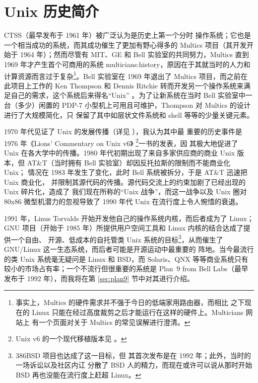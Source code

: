 \newpart
\section{Unix 历史简介}\label{sec:intro}

CTSS（最早发布于 1961 年）被广泛认为是历史上第一个分时
操作系统；它也是一个相当成功的系统，而其成功催生了更加有野心得多的 Multics%
 项目（其开发开始于 1964 年）；然而尽管有 MIT、GE 和
Bell 实验室的共同努力，Multics 直到 1969 年才产生首个可商用的系统\cupercite%
{multicians:history}，原因在于其就当时的人力和计算资源而言过于复杂\footnote{%
\label{fn:multics}事实上，Multics 的硬件需求并不强于今日的低端家用路由器，而相比
之下现在的 Linux 只能在经过高度裁剪之后才能运行在这样的硬件上。Multicians 网站上
有一个页面对关于 Multics 的常见误解进行澄清。}。Bell
实验室在 1969 年退出了 Multics 项目，而之前在此项目上工作的 Ken Thompson 和
Dennis Ritchie 转而开发另一个操作系统来满足自己的需求，这个系统后来得名“Unix”%
。为了让新系统在当时 Bell 实验室中一台（多少）闲置的
PDP-7 小型机上可用且可维护，Thompson 对 Multics 的设计进行了大规模简化，只
保留了其中如层状文件系统和 shell 等等的少量关键元素。

1970 年代见证了 Unix 的发展传播（详见 \parencite{wiki:unixhist}），我认为其中最
重要的历史事件是 1976 年《Lions' Commentary on Unix v6》%
\footnote{Unix v6 的一个现代移植版本见 \parencite{wiki:xv6}。}一书的发表，因
其极大地促进了 Unix 在各大学中的传播。1980 年代初期出现了来自多家供应商的商业
Unix 版本，但 AT\&T（当时拥有 Bell 实验室）却因反托拉斯的限制而不能商业化 Unix；
情况在 1983 年发生了变化，此时 Bell 系统被拆分，于是 AT\&T 迅速把 Unix 商业化，
并限制其源代码的传播。源代码交流上的约束加剧了已经出现的 Unix 碎片化，造成了
我们现在所称的“Unix 战争”，而这一战争以及 Unix 圈对
80x86 微型机潜力的忽视导致了 1990 年代 Unix 在流行度上令人惋惜的衰退。

1991 年，Linus Torvalds 开始开发他自己的操作系统内核，而后者成为了 Linux；GNU
项目（开始于 1985 年）所提供用户空间工具和 Linux 内核的结合达成了提供一个自由、
开源、低成本的自托管类 Unix 系统的目标\footnote{386BSD 项目也达成了这一目标，但
其首次发布是在 1992 年；此外，当时的一场诉讼以及社区内讧%
分散了 BSD 人的精力，而现在或许可以说从那时开始 BSD 再也没能在流行度上赶超
Linux。}，从而催生了 GNU/Linux 这一生态系统，而后者可能是开源运动中最重要的
阵地。当今最流行的类 Unix 系统毫无疑问是 Linux 和 BSD，而 Solaris、QNX
等等商业系统只有较小的市场占有率；一个不流行但很重要的系统是 Plan~9 from
Bell Labs（最早发布于 1992 年），而我将在第 \ref{sec:plan9} 节中对其进行介绍。

